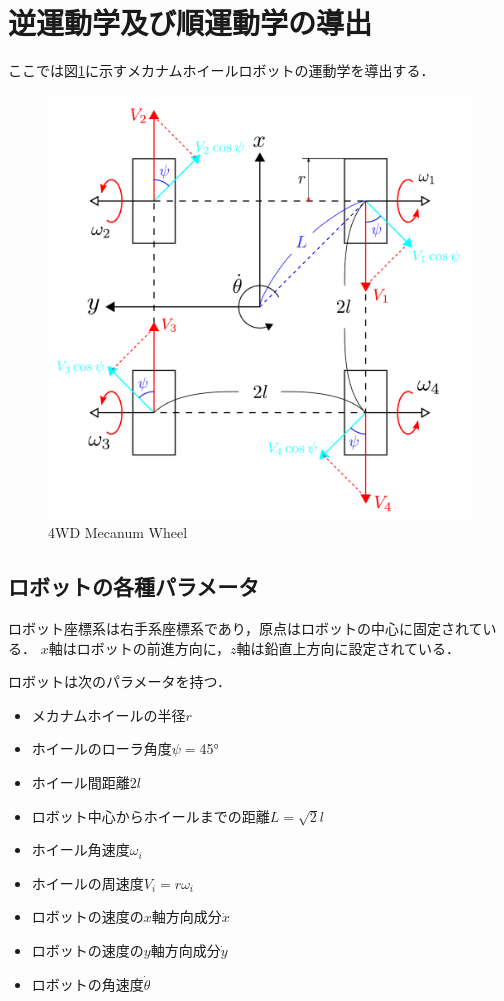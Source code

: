 \documentclass[../master]{subfiles}
\begin{document}
  \section{逆運動学及び順運動学の導出}

  ここでは図\ref{fig:mecanum}に示すメカナムホイールロボットの運動学を導出する．

  \begin{figure}[h]
    \centering
    \includegraphics[width=120truemm, clip]{images/mecanum.pdf}
    \caption{4WD Mecanum Wheel}
    \label{fig:mecanum}
  \end{figure}

  \subsection{ロボットの各種パラメータ}

  ロボット座標系は右手系座標系であり，原点はロボットの中心に固定されている．
  $x$軸はロボットの前進方向に，$z$軸は鉛直上方向に設定されている．

  ロボットは次のパラメータを持つ．

  \begin{itemize}
    \item メカナムホイールの半径$r$
    \item ホイールのローラ角度$\psi =$\ang{45}
    \item ホイール間距離$2l$
    \item ロボット中心からホイールまでの距離$L = \sqrt{2}l$
    \item ホイール角速度$\omega_{i}$
    \item ホイールの周速度$V_{i} = r\omega_{i}$
    \item ロボットの速度の$x$軸方向成分$\dot{x}$
    \item ロボットの速度の$y$軸方向成分$\dot{y}$
    \item ロボットの角速度$\dot{\theta}$
  \end{itemize}
\end{document}
